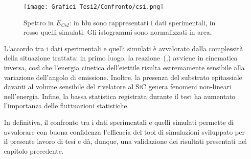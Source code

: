 \begin{figure} [!p]
	\centering
	\texttt{[image: Grafici\_Tesi2/Confronto/csi.png]}
	\caption{Spettro in $E_{CsI}$: in blu sono rappresentati i dati sperimentali, in rosso quelli simulati. Gli istogrammi sono normalizzati in area.} \label{fig:spettro_csi_confronto}
\end{figure}

L'accordo tra i dati sperimentali e quelli simulati è avvalorato dalla complessità della situazione trattata: in primo luogo, la reazione~(,) avviene in cinematica inversa, così che l'energia cinetica dell'eiettile risulta estremamente sensibile alla variazione dell'angolo di emissione. 
Inoltre, la presenza del substrato epitassiale davanti al volume sensibile del rivelatore al SiC genera fenomeni non-lineari nell'energia.
Infine, la bassa statistica registrata durante il test ha aumentato l'importanza delle fluttuazioni statistiche.


In definitiva, il confronto tra i dati sperimentali e quelli simulati permette di avvalorare con buona confidenza l'efficacia del tool di simulazioni sviluppato per il presente lavoro di tesi e dà, dunque, una validazione dei risultati presentati nel capitolo precedente.

